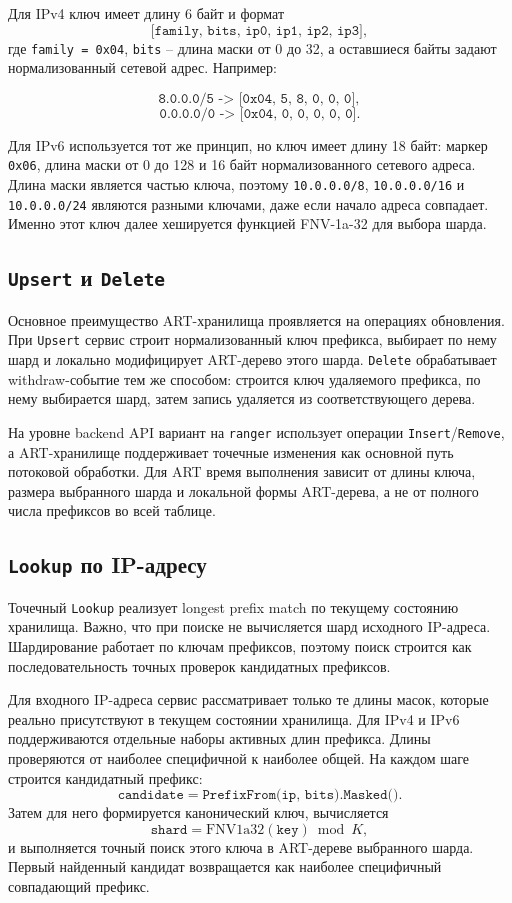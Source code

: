Для IPv4 ключ имеет длину 6 байт и формат
$$\texttt{[family, bits, ip0, ip1, ip2, ip3]},$$
где \texttt{family = 0x04}, \texttt{bits} -- длина маски от 0 до
32, а оставшиеся байты задают нормализованный сетевой адрес. Например:

$$\texttt{8.0.0.0/5 -> [0x04, 5, 8, 0, 0, 0]},$$
$$\texttt{0.0.0.0/0 -> [0x04, 0, 0, 0, 0, 0]}.$$

Для IPv6 используется тот же принцип, но ключ имеет длину 18 байт:
маркер \texttt{0x06}, длина маски от 0 до 128 и 16 байт нормализованного
сетевого адреса. Длина маски является частью ключа, поэтому
\texttt{10.0.0.0/8}, \texttt{10.0.0.0/16} и \texttt{10.0.0.0/24}
являются разными ключами, даже если начало адреса совпадает. Именно этот
ключ далее хешируется функцией FNV-1a-32 для выбора шарда.

\subsection{\texttt{Upsert} и \texttt{Delete}}

Основное преимущество ART-хранилища проявляется на операциях
обновления. При \texttt{Upsert} сервис строит нормализованный ключ
префикса, выбирает по нему шард и локально модифицирует ART-дерево этого
шарда. \texttt{Delete} обрабатывает withdraw-событие тем же способом:
строится ключ удаляемого префикса, по нему выбирается шард, затем запись
удаляется из соответствующего дерева.

На уровне backend API вариант на \texttt{ranger} использует операции
\texttt{Insert}/\texttt{Remove}, а ART-хранилище поддерживает точечные
изменения как основной путь потоковой обработки. Для ART время выполнения
зависит от длины ключа, размера выбранного шарда и локальной формы
ART-дерева, а не от полного числа префиксов во всей таблице.

\subsection{\texttt{Lookup} по IP-адресу}

Точечный \texttt{Lookup} реализует longest prefix match по текущему
состоянию хранилища. Важно, что при поиске не вычисляется шард исходного
IP-адреса. Шардирование работает по ключам префиксов, поэтому поиск
строится как последовательность точных проверок кандидатных префиксов.

Для входного IP-адреса сервис рассматривает только те длины масок,
которые реально присутствуют в текущем состоянии хранилища. Для IPv4 и
IPv6 поддерживаются отдельные наборы активных длин префикса. Длины
проверяются от наиболее специфичной к наиболее общей. На каждом шаге
строится кандидатный префикс:
$$
\texttt{candidate} = \texttt{PrefixFrom(ip, bits).Masked()}.
$$
Затем для него формируется канонический ключ, вычисляется
$$
\texttt{shard} = \mathrm{FNV1a32}(\texttt{key}) \bmod K,
$$
и выполняется точный поиск этого ключа в ART-дереве выбранного шарда.
Первый найденный кандидат возвращается как наиболее специфичный
совпадающий префикс.

